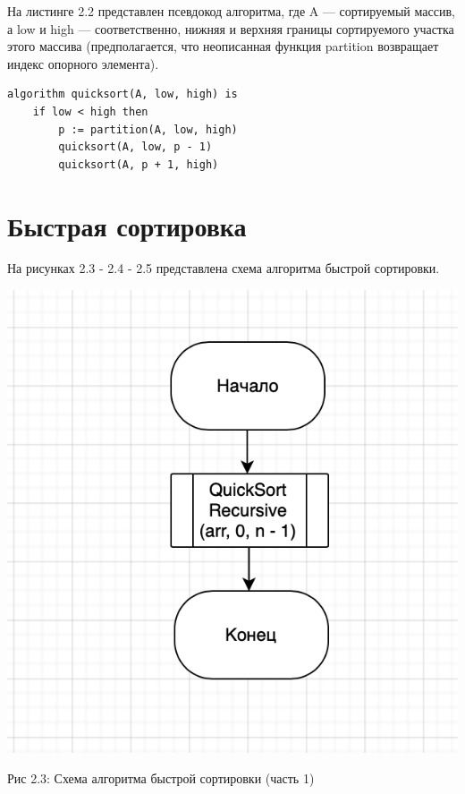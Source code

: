 \documentclass[12pt]{report}
\begin{document}
На листинге 2.2 представлен псевдокод алгоритма, где A — сортируемый массив, а low и high — соответственно, нижняя и верхняя границы сортируемого участка этого массива (предполагается, что неописанная функция partition возвращает индекс опорного элемента).

\begin{lstlisting}[label=some-code,caption=Псевдокод алгоритма быстрой сортировки]
algorithm quicksort(A, low, high) is
    if low < high then
        p := partition(A, low, high)
        quicksort(A, low, p - 1)
        quicksort(A, p + 1, high)\end{lstlisting}

\newpage
\section{Быстрая сортировка}

На рисунках 2.3 - 2.4 - 2.5 представлена схема алгоритма быстрой сортировки.

\begin{center}
		\includegraphics[scale=0.8]{schema/QuickSort.png}
		
			Рис 2.3: Схема алгоритма быстрой сортировки (часть 1)
\end{center}
\end{document}
